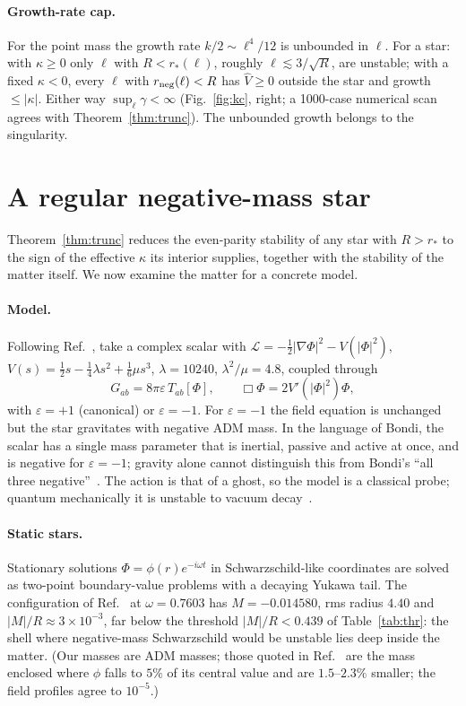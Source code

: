 \documentclass[11pt]{article}
\theoremstyle{remark}
\newcommand{\Vhat}{\hat{V}}
\begin{document}
\paragraph{Growth-rate cap.} For the point mass the growth rate $k/2\sim\ell^4/12$ is unbounded in $\ell$. For a star:
with $\kappa\ge0$ only $\ell$ with $R<r_*(\ell)$, roughly $\ell\lesssim3/\sqrt{R}$, are unstable; with a fixed $\kappa<0$,
every $\ell$ with $r_{\rm neg}(\ell)<R$ has $\Vhat\ge0$ outside the star and growth $\le|\kappa|$. Either way
$\sup_\ell\gamma<\infty$ (Fig.~\ref{fig:kc}, right; a 1000-case numerical scan agrees with Theorem~\ref{thm:trunc}).
The unbounded growth belongs to the singularity.

\section{A regular negative-mass star}\label{sec:bs}

Theorem~\ref{thm:trunc} reduces the even-parity stability of any star with $R>r_*$ to the sign of the effective $\kappa$
its interior supplies, together with the stability of the matter itself. We now examine the matter for a concrete
model.

\paragraph{Model.} Following Ref.~\cite{Shirokov2026}, take a complex scalar with
$\mathcal L=-\tfrac12|\nabla\Phi|^2-V(|\Phi|^2)$, $V(s)=\tfrac12s-\tfrac14\lambda s^2+\tfrac16\mu s^3$, $\lambda=10240$,
$\lambda^2/\mu=4.8$, coupled through
\begin{equation}
G_{ab}=8\pi\varepsilon\,T_{ab}[\Phi],\qquad \Box\Phi=2V'(|\Phi|^2)\Phi,
\end{equation}
with $\varepsilon=+1$ (canonical) or $\varepsilon=-1$. For $\varepsilon=-1$ the field equation is unchanged but the
star gravitates with negative ADM mass. In the language of Bondi, the scalar has a single mass parameter that is
inertial, passive and active at once, and is negative for $\varepsilon=-1$; gravity alone cannot distinguish this from
Bondi's ``all three negative''~\cite{Bondi1957,Bonnor1989}. The action is that of a ghost, so the model is a classical
probe; quantum mechanically it is unstable to vacuum decay~\cite{CJM2004}.

\paragraph{Static stars.} Stationary solutions $\Phi=\phi(r)e^{-i\omega t}$ in Schwarzschild-like coordinates are
solved as two-point boundary-value problems with a decaying Yukawa tail. The configuration of Ref.~\cite{Shirokov2026}
at $\omega=0.7603$ has $M=-0.014580$, rms radius $4.40$ and $|M|/R\approx3\times10^{-3}$, far below the threshold
$|M|/R<0.439$ of Table~\ref{tab:thr}: the shell where negative-mass Schwarzschild would be unstable lies deep inside the
matter. (Our masses are ADM masses; those quoted in Ref.~\cite{Shirokov2026} are the mass enclosed where $\phi$ falls to
$5\%$ of its central value and are $1.5$--$2.3\%$ smaller; the field profiles agree to $10^{-5}$.)
\end{document}
